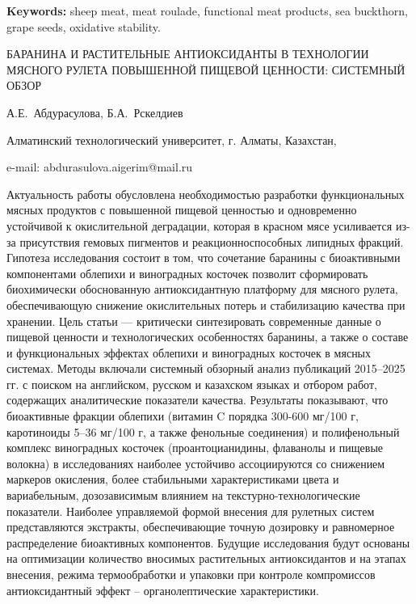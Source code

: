 {\bfseries Keywords:} sheep meat, meat roulade, functional meat products,
sea buckthorn, grape seeds, oxidative stability.

\begin{header}
БАРАНИНА И РАСТИТЕЛЬНЫЕ АНТИОКСИДАНТЫ В ТЕХНОЛОГИИ МЯСНОГО РУЛЕТА ПОВЫШЕННОЙ ПИЩЕВОЙ ЦЕННОСТИ: СИСТЕМНЫЙ ОБЗОР

А.Е.~Абдурасулова\envelope,
Б.А.~Рскелдиев
\end{header}

\begin{affil}
Алматинский технологический университет, г. Алматы, Казахстан,

e-mail: abdurasulova.aigerim@mail.ru
\end{affil}

Актуальность работы обусловлена необходимостью разработки функциональных
мясных продуктов с повышенной пищевой ценностью и одновременно
устойчивой к окислительной деградации, которая в красном мясе
усиливается из-за присутствия гемовых пигментов и реакционноспособных
липидных фракций. Гипотеза исследования состоит в том, что сочетание
баранины с биоактивными компонентами облепихи и виноградных косточек
позволит сформировать биохимически обоснованную антиоксидантную
платформу для мясного рулета, обеспечивающую снижение окислительных
потерь и стабилизацию качества при хранении. Цель статьи --- критически
синтезировать современные данные о пищевой ценности и технологических
особенностях баранины, а также о составе и функциональных эффектах
облепихи и виноградных косточек в мясных системах. Методы включали
системный обзорный анализ публикаций 2015--2025 гг. с поиском на
английском, русском и казахском языках и отбором работ, содержащих
аналитические показатели качества. Результаты показывают, что
биоактивные фракции облепихи (витамин C порядка 300-600 мг/100 г,
каротиноиды 5--36 мг/100 г, а также фенольные соединения) и
полифенольный комплекс виноградных косточек (проантоцианидины, флаванолы
и пищевые волокна) в исследованиях наиболее устойчиво ассоциируются со
снижением маркеров окисления, более стабильными характеристиками цвета и
вариабельным, дозозависимым влиянием на текстурно-технологические
показатели. Наиболее управляемой формой внесения для рулетных систем
представляются экстракты, обеспечивающие точную дозировку и равномерное
распределение биоактивных компонентов. Будущие исследования будут
основаны на оптимизации количество вносимых растительных антиоксидантов
и на этапах внесения, режима термообработки и упаковки при контроле
компромиссов антиоксидантный эффект -- органолептические характеристики.

